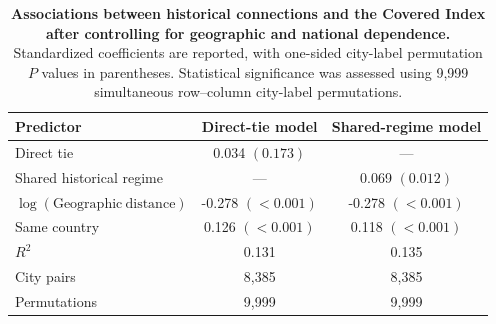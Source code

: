 \begin{table}[!htbp]
\centering
\caption{\textbf{Associations between historical connections and the Covered Index after controlling for geographic and national dependence.} Standardized coefficients are reported, with one-sided city-label permutation $P$ values in parentheses. Statistical significance was assessed using 9,999 simultaneous row--column city-label permutations.}
\label{tab:permutation-regression}
\begin{tabular}{lcc}
\toprule
Predictor & Direct-tie model & Shared-regime model \\
\midrule
Direct tie & 0.034 $(0.173)$ & --- \\
Shared historical regime & --- & 0.069 $(0.012)$ \\
$\log(\mathrm{Geographic\ distance})$ & -0.278 $(<0.001)$ & -0.278 $(<0.001)$ \\
Same country & 0.126 $(<0.001)$ & 0.118 $(<0.001)$ \\
\midrule
$R^2$ & 0.131 & 0.135 \\
City pairs & 8,385 & 8,385 \\
Permutations & 9,999 & 9,999 \\
\bottomrule
\end{tabular}
\end{table}
